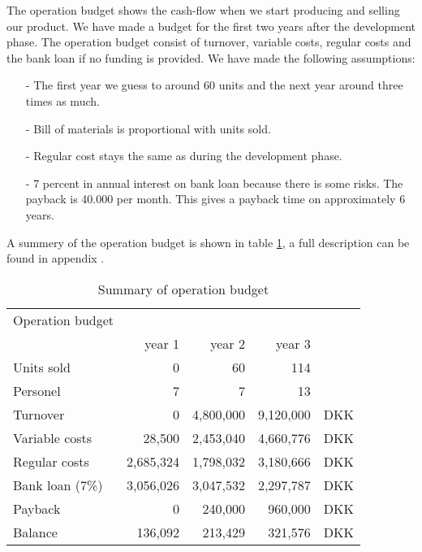 The operation budget shows the cash-flow when we start producing and selling our product. We have made a budget for the first two years after the development phase. The operation budget consist of turnover, variable costs, regular costs and the bank loan if no funding is provided. We have made the following assumptions:
\begin{itemize}
\item[-] The first year we guess to around 60 units and the next year around three times as much.
\item[-] Bill of materials is proportional with units sold.
\item[-] Regular cost stays the same as during the development phase.
\item[-] 7 percent in annual interest on bank loan because there is some risks. The payback is 40.000 per month. This gives a payback time on approximately 6 years.
\end{itemize}
A summery of the operation budget is shown in table \ref{opebud}, a full description can be found in appendix .
\begin{table}[h!]
\centering
\begin{tabular}{l r r r r}
Operation budget      &            &              &             &    \\
                      & year 1     & year 2       & year 3      &    \\
\hline                                                               
Units sold            &          0 &        60   &         114  &    \\
Personel              &          7 &         7   &          13  &    \\ 
\hline                                              
Turnover              &          0 & 4,800,000   &   9,120,000  & DKK\\
Variable costs        &     28,500 & 2,453,040   &   4,660,776  & DKK\\
Regular costs         &  2,685,324 & 1,798,032   &   3,180,666  & DKK\\
Bank loan (7\%)       &  3,056,026 & 3,047,532   &   2,297,787  & DKK\\
Payback               &          0 &   240,000   &     960,000  & DKK\\
Balance               &    136,092 &   213,429   &     321,576  & DKK\\  
\end{tabular}
\caption{Summary of operation budget}
\label{opebud}
\end{table}
